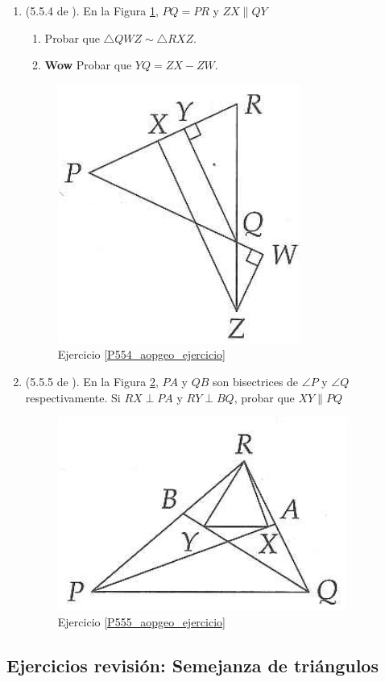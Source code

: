 \begin{enumerate}
	\item \label{P554_aopgeo_ejercicio} (5.5.4 de \cite{Aops_Geometria}). En la Figura \ref{554_aopgeo}, $PQ=PR$ y $ZX\parallel QY$
	\begin{enumerate}[label=\Alph*)]
		\item Probar que $\triangle QWZ \sim \triangle RXZ$.
		\item \textbf{Wow} Probar que $YQ = ZX-ZW$.
	\end{enumerate}
	\begin{figure}[H]
		\centering
		\includegraphics[width=0.3\linewidth]{Geometria/imgs/554_aopgeo_ejer}
		\caption{Ejercicio \ref{P554_aopgeo_ejercicio} }
		\label{554_aopgeo}
	\end{figure}		

	\item \label{P555_aopgeo_ejercicio} (5.5.5 de \cite{Aops_Geometria}). En la Figura \ref{555_aopgeo}, $PA$ y $QB$ son bisectrices de $\angle P$ y $\angle Q$ respectivamente. Si $RX\perp PA$ y $RY\perp BQ$, probar que $XY\parallel PQ$
	\begin{figure}[H]
		\centering
		\includegraphics[width=0.3\linewidth]{Geometria/imgs/555_aopgeo_ejer}
		\caption{Ejercicio \ref{P555_aopgeo_ejercicio} }
		\label{555_aopgeo}
	\end{figure}		
	
\end{enumerate}
\newpage

\begin{center}
	\vspace{-1cm}
	\section{ Ejercicios revisión: Semejanza de triángulos}
\end{center}

